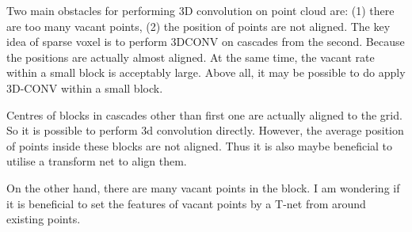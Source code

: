 \documentclass{article}
\begin{document}
\par \par
Two main obstacles for performing 3D convolution on point cloud are: (1) there are too many vacant points, (2) the position of points are not aligned.
The key idea of sparse voxel is to perform 3DCONV on cascades from the second. Because the positions are actually almost aligned. At the same time, the vacant rate within a small block is acceptably large. Above all, it may be possible to do apply 3D-CONV within a small block. 
\par
Centres of blocks in cascades other than first one are actually aligned to the grid. So it is possible to perform 3d convolution directly. However, the average position of points inside these blocks are not aligned. Thus it is also maybe beneficial to utilise a transform net to align them.\par
On the other hand, there are many vacant points in the block. I am wondering if it is beneficial to set the features of vacant points by a T-net from around existing points.
\par
\end{document}
